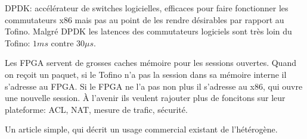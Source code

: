 DPDK: accélérateur de switches logicielles, efficaces pour faire fonctionner les commutateurs x86 mais pas au point de les rendre désirables par rapport au Tofino. Malgré DPDK les latences des commutateurs logiciels sont très loin du Tofino: $1ms$ contre $30\mu s$.


Les FPGA servent de grosses caches mémoire pour les sessions ouvertes. Quand on reçoit un paquet, si le Tofino n'a pas la session dans sa mémoire interne il s'adresse au FPGA. Si le FPGA ne l'a pas non plus il s'adresse au x86, qui ouvre une nouvelle session. À l'avenir ils veulent rajouter plus de foncitons sur leur plateforme: ACL, NAT, mesure de trafic, sécurité.

 Un article simple, qui décrit un usage commercial existant de l'hétérogène.

\clearpage
